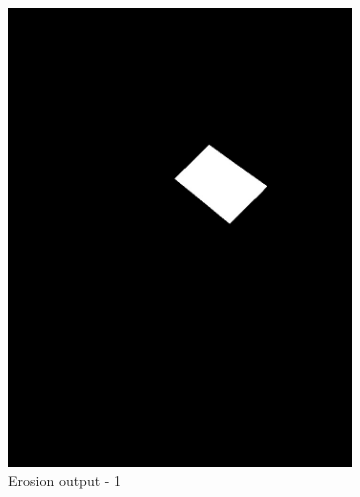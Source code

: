 \documentclass[paper=a4, fontsize=10pt]{scrartcl} %
\numberwithin{equation}{section} %
\numberwithin{figure}{section} %
\begin{document}
\begin{figure}[!ht]
	\centering
	\begin{subfigure}[b]{0.275\textwidth}
		\includegraphics[width=\textwidth]{erosion_01}
		\caption{Erosion output - 1}
		\label{fig:erosion_01}
	\end{subfigure}
	~ 
	\begin{subfigure}[b]{0.275\textwidth}

\end{subfigure}
\end{figure}
\end{document}
